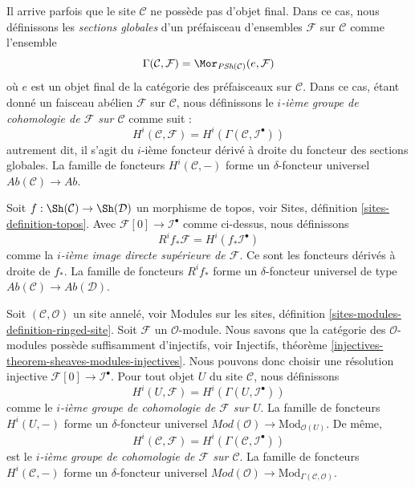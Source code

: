 \medskip\noindent
Il arrive parfois que
le site $\mathcal{C}$ ne possède pas d'objet final. Dans ce
cas, nous définissons les {\it sections globales} d'un préfaisceau
d'ensembles $\mathcal{F}$ sur $\mathcal{C}$ comme l'ensemble
\begin{equation}
\label{equation-global-sections}
\Gamma(\mathcal{C}, \mathcal{F}) =
\Mor_{\textit{PSh}(\mathcal{C})}(e, \mathcal{F})
\end{equation}
où $e$ est un objet final de la catégorie des préfaisceaux sur $\mathcal{C}$.
Dans ce cas, étant donné un faisceau abélien $\mathcal{F}$ sur $\mathcal{C}$,
nous définissons le {\it $i$-ième groupe de cohomologie de $\mathcal{F}$ sur $\mathcal{C}$}
comme suit :
\begin{equation}
\label{equation-cohomology}
H^i(\mathcal{C}, \mathcal{F}) = H^i(\Gamma(\mathcal{C}, \mathcal{I}^\bullet))
\end{equation}
autrement dit, il s'agit du $i$-ième foncteur dérivé à droite du
foncteur des sections globales.
La famille de foncteurs $H^i(\mathcal{C}, -)$ forme un $\delta$-foncteur universel
$\textit{Ab}(\mathcal{C}) \to \textit{Ab}$.

\medskip\noindent
Soit $f : \Sh(\mathcal{C}) \to \Sh(\mathcal{D})$ un morphisme de topos, voir
Sites, définition \ref{sites-definition-topos}.
Avec $\mathcal{F}[0] \to \mathcal{I}^\bullet$ comme ci-dessus,
nous définissons
\begin{equation}
\label{equation-higher-direct-image}
R^if_*\mathcal{F} = H^i(f_*\mathcal{I}^\bullet)
\end{equation}
comme la {\it $i$-ième image directe supérieure de $\mathcal{F}$}.
Ce sont les foncteurs dérivés à droite de $f_*$.
La famille de foncteurs $R^if_*$ forme un $\delta$-foncteur universel
de type $\textit{Ab}(\mathcal{C}) \to \textit{Ab}(\mathcal{D})$.

\medskip\noindent
Soit $(\mathcal{C}, \mathcal{O})$ un site annelé, voir
Modules sur les sites, définition \ref{sites-modules-definition-ringed-site}.
Soit $\mathcal{F}$ un $\mathcal{O}$-module.
Nous savons que la catégorie des $\mathcal{O}$-modules
possède suffisamment d'injectifs, voir
Injectifs, théorème \ref{injectives-theorem-sheaves-modules-injectives}.
Nous pouvons donc choisir une résolution injective
$\mathcal{F}[0] \to \mathcal{I}^\bullet$.
Pour tout objet $U$ du site $\mathcal{C}$, nous définissons
\begin{equation}
\label{equation-cohomology-object-site-modules}
H^i(U, \mathcal{F}) = H^i(\Gamma(U, \mathcal{I}^\bullet))
\end{equation}
comme le {\it $i$-ième groupe de cohomologie de $\mathcal{F}$ sur $U$}.
La famille de foncteurs $H^i(U, -)$ forme un $\delta$-foncteur universel
$\textit{Mod}(\mathcal{O}) \to \text{Mod}_{\mathcal{O}(U)}$. De même,
\begin{equation}
\label{equation-cohomology-modules}
H^i(\mathcal{C}, \mathcal{F}) = H^i(\Gamma(\mathcal{C}, \mathcal{I}^\bullet))
\end{equation}
est le {\it $i$-ième groupe de cohomologie de $\mathcal{F}$ sur $\mathcal{C}$}.
La famille de foncteurs $H^i(\mathcal{C}, -)$ forme un
$\delta$-foncteur universel
$\textit{Mod}(\mathcal{O}) \to \text{Mod}_{\Gamma(\mathcal{C}, \mathcal{O})}$.

